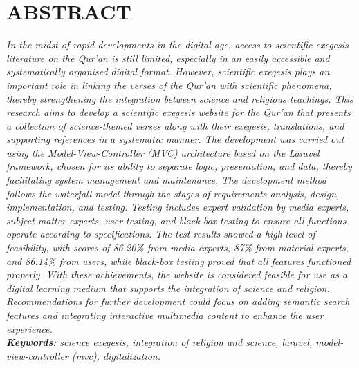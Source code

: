 \chapter*{ABSTRACT}

\textit{In the midst of rapid developments in the digital age, access to scientific exegesis literature on the Qur'an is still limited, especially in an easily accessible and systematically organised digital format. However, scientific exegesis plays an important role in linking the verses of the Qur'an with scientific phenomena, thereby strengthening the integration between science and religious teachings. This research aims to develop a scientific exegesis website for the Qur'an that presents a collection of science-themed verses along with their exegesis, translations, and supporting references in a systematic manner. The development was carried out using the Model-View-Controller (MVC) architecture based on the Laravel framework, chosen for its ability to separate logic, presentation, and data, thereby facilitating system management and maintenance. The development method follows the waterfall model through the stages of requirements analysis, design, implementation, and testing. Testing includes expert validation by media experts, subject matter experts, user testing, and black-box testing to ensure all functions operate according to specifications. The test results showed a high level of feasibility, with scores of 86.20\% from media experts, 87\% from material experts, and 86.14\% from users, while black-box testing proved that all features functioned properly. With these achievements, the website is considered feasible for use as a digital learning medium that supports the integration of science and religion. Recommendations for further development could focus on adding semantic search features and integrating interactive multimedia content to enhance the user experience.}\\

\noindent\textit{\textbf{Keywords:} science exegesis, integration of religion and science, laravel, model-view-controller (mvc), digitalization.}\\


